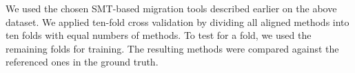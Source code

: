
We used the chosen SMT-based migration tools described earlier on the
above dataset. We applied ten-fold cross validation by dividing all
aligned methods into ten folds with equal numbers of methods. To
test for a fold, we used the remaining folds for training. The
resulting methods were compared against the referenced ones in the
ground truth.



